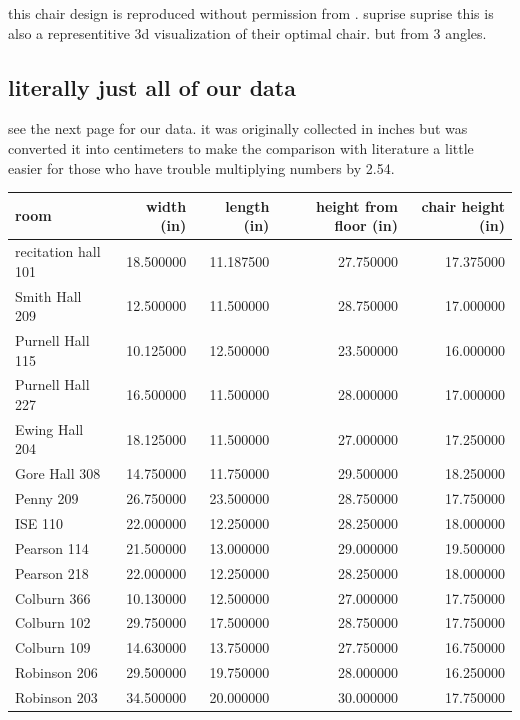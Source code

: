 \documentclass[conference]{IEEEtran}
\begin{document}
this chair design is reproduced without permission from \cite{Ansari}. suprise suprise this is also a representitive 3d visualization of their optimal chair. but from 3 angles. 

\subsection{literally just all of our data}
see the next page for our data. it was originally collected in inches but was converted it into centimeters to make the comparison with literature a little easier for those who have trouble multiplying numbers by 2.54.



\clearpage
\onecolumn
\centering
\begin{tabular}{l|r|r|r|r}
    \toprule
    room & width (in) & length (in) & height from floor (in) & chair height (in) \\
    \midrule
    recitation hall 101 & 18.500000 & 11.187500 & 27.750000 & 17.375000 \\
    Smith Hall 209 & 12.500000 & 11.500000 & 28.750000 & 17.000000 \\
    Purnell Hall 115 & 10.125000 & 12.500000 & 23.500000 & 16.000000 \\
    Purnell Hall 227 & 16.500000 & 11.500000 & 28.000000 & 17.000000 \\
    Ewing Hall 204 & 18.125000 & 11.500000 & 27.000000 & 17.250000 \\
    Gore Hall 308 & 14.750000 & 11.750000 & 29.500000 & 18.250000 \\
    Penny 209 & 26.750000 & 23.500000 & 28.750000 & 17.750000 \\
    ISE 110 & 22.000000 & 12.250000 & 28.250000 & 18.000000 \\
    Pearson 114 & 21.500000 & 13.000000 & 29.000000 & 19.500000 \\
    Pearson 218 & 22.000000 & 12.250000 & 28.250000 & 18.000000 \\
    Colburn 366 & 10.130000 & 12.500000 & 27.000000 & 17.750000 \\
    Colburn 102 & 29.750000 & 17.500000 & 28.750000 & 17.750000 \\
    Colburn 109 & 14.630000 & 13.750000 & 27.750000 & 16.750000 \\
    Robinson 206 & 29.500000 & 19.750000 & 28.000000 & 16.250000 \\
    Robinson 203 & 34.500000 & 20.000000 & 30.000000 & 17.750000 \\

\end{tabular}
\end{document}
